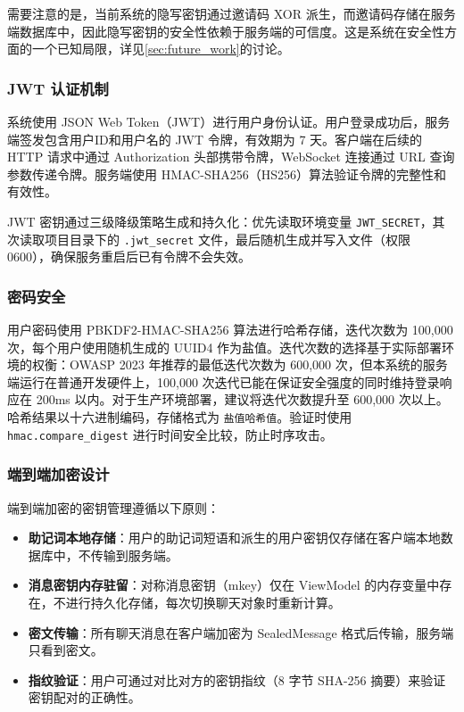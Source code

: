 需要注意的是，当前系统的隐写密钥通过邀请码 XOR 派生，而邀请码存储在服务端数据库中，因此隐写密钥的安全性依赖于服务端的可信度。这是系统在安全性方面的一个已知局限，详见\cref{sec:future_work}的讨论。

\subsubsection{JWT 认证机制}

系统使用 JSON Web Token（JWT）进行用户身份认证。用户登录成功后，服务端签发包含用户ID和用户名的 JWT 令牌，有效期为 7 天。客户端在后续的 HTTP 请求中通过 Authorization 头部携带令牌，WebSocket 连接通过 URL 查询参数传递令牌。服务端使用 HMAC-SHA256（HS256）算法验证令牌的完整性和有效性。

JWT 密钥通过三级降级策略生成和持久化：优先读取环境变量 \texttt{JWT\_SECRET}，其次读取项目目录下的 \texttt{.jwt\_secret} 文件，最后随机生成并写入文件（权限 0600），确保服务重启后已有令牌不会失效。

\subsubsection{密码安全}

用户密码使用 PBKDF2-HMAC-SHA256 算法进行哈希存储，迭代次数为 100,000 次，每个用户使用随机生成的 UUID4 作为盐值。迭代次数的选择基于实际部署环境的权衡：OWASP 2023 年推荐的最低迭代次数为 600,000 次，但本系统的服务端运行在普通开发硬件上，100,000 次迭代已能在保证安全强度的同时维持登录响应在 200ms 以内。对于生产环境部署，建议将迭代次数提升至 600,000 次以上。哈希结果以十六进制编码，存储格式为 \texttt{盐值\textdollar 哈希值}。验证时使用 \texttt{hmac.compare\_digest} 进行时间安全比较，防止时序攻击。

\subsubsection{端到端加密设计}

端到端加密的密钥管理遵循以下原则：

\begin{itemize}
    \item \textbf{助记词本地存储}：用户的助记词短语和派生的用户密钥仅存储在客户端本地数据库中，不传输到服务端。
    \item \textbf{消息密钥内存驻留}：对称消息密钥（mkey）仅在 ViewModel 的内存变量中存在，不进行持久化存储，每次切换聊天对象时重新计算。
    \item \textbf{密文传输}：所有聊天消息在客户端加密为 SealedMessage 格式后传输，服务端只看到密文。
    \item \textbf{指纹验证}：用户可通过对比对方的密钥指纹（8 字节 SHA-256 摘要）来验证密钥配对的正确性。
\end{itemize}

